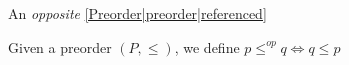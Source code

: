 
An \emph{opposite} \ref{Preorder|preorder|referenced}

Given a preorder $(P, \leq)$, we define $p \leq^{op} q \iff q \leq p$
